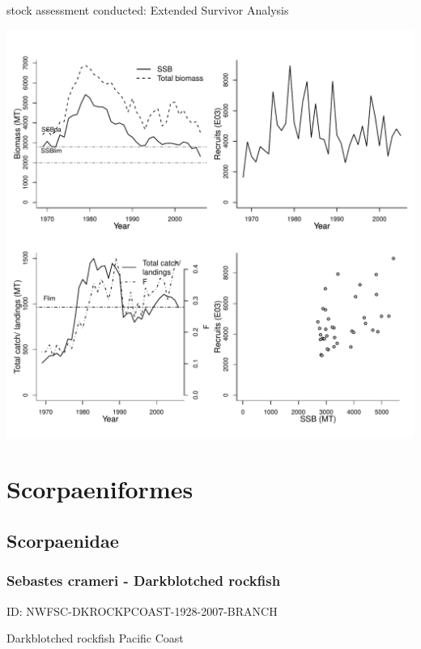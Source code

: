 stock assessment conducted: Extended Survivor Analysis 
\begin{center}
\vspace{-0.2cm}\includegraphics[scale=0.65]{../tex/figures/plot-WGSSDS-SOLEVIIe-1968-2006-JENNINGS.pdf}
\end{center}

\newpage
\section{Scorpaeniformes}

\subsection{Scorpaenidae}

\subsubsection{Sebastes crameri - Darkblotched rockfish}
ID: NWFSC-DKROCKPCOAST-1928-2007-BRANCH

Darkblotched rockfish Pacific Coast 

